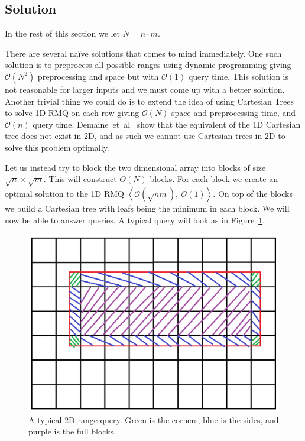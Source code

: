 \documentclass[a4paper,oneside,article,11pt]{memoir}
\begin{document}

\subsection{Solution}
In the rest of this section we let $N = n\cdot m$.

There are several naïve solutions that comes to mind immediately. One such solution is to preprocess all possible ranges using dynamic programming giving $\mathcal{O}(N^2)$ preprocessing and space but with $\mathcal{O}(1)$ query time.
This solution is not reasonable for larger inputs and we must come up with a better solution. Another trivial thing we could do is to extend the idea of using Cartesian Trees\cite{vuillemin80,tarjan84} to solve 1D-RMQ on each row giving $\mathcal{O}(N)$ space and preprocessing time, and $\mathcal{O}(n)$ query time. Demaine~et~al~\cite{demaine09} show that the equivalent of the 1D Cartesian tree does not exist in 2D, and as such we cannot use Cartesian trees in 2D to solve this problem optimally.

Let us instead try to block the two dimensional array into blocks of size $\sqrt{n} \times \sqrt{m}$. This will construct $\Theta(N)$ blocks. For each block we create an optimal solution to the 1D RMQ $\left\langle \mathcal{O}(\sqrt{nm}),\ \mathcal{O}(1)\right\rangle$. On top of the blocks we build a Cartesian tree with leafs being the minimum in each block.
We will now be able to answer queries. A typical query will look as in Figure~\ref{fig:rmq_query}.

\begin{figure}[h!]
\includegraphics[width=\textwidth]{../figures/RMQ_query.png}
\caption{\label{fig:rmq_query}A typical 2D range query. Green is the corners, blue is the sides, and purple is the full blocks.}
\end{figure}
\end{document}
